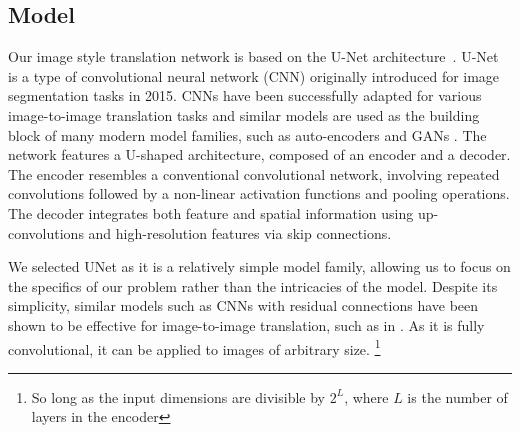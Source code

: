 \subsection{Model}
\label{subsec:model}

Our image style translation network is based on the U-Net
architecture~\cite{unet}. U-Net is a type of convolutional neural network (CNN)
originally introduced for image segmentation tasks in 2015. CNNs have been
successfully adapted for various image-to-image translation tasks and similar models are used as the
building block of many modern model families, such as auto-encoders \cite{raw-to-raw} and GANs \cite{perceptual-losses-style-transfer}. The network features a U-shaped architecture, composed of an encoder and a decoder. The encoder
resembles a conventional convolutional network, involving repeated convolutions
followed by a non-linear activation functions and pooling operations. The decoder integrates both feature and spatial information using up-convolutions and high-resolution features via skip connections.

We selected UNet as it is a relatively simple model family, allowing us to focus on
the specifics of our problem rather than the intricacies of the model. Despite its simplicity, similar models such as CNNs with residual connections have been shown to be effective for image-to-image translation, such as in \cite{dslr-quality}. As it is fully convolutional, it can be applied to images of arbitrary size.
\footnote{So long as the input dimensions are divisible by $2^L$, where $L$ is
the number of layers in the encoder}



